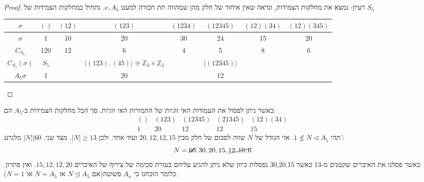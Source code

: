 \documentclass{tstextbook}
\begin{document}
\begin{proof}
רעיון: נמצא את מחלקות הצמידות, ונראה שאין איחוד של חלק מהן שמהווה תת חבורה למעט \(e,A_{5}\). נתחיל במחלקות הצמידות של \(S_{5}\)

  \begin{table}[htbp]
    \centering
    \begin{tabular}{|cccccccc|}
      \hline
      \(\sigma\) & \(()\) & \((12)\) & \((123)\) & \((1234)\) & \((12345)\) & \((12)(34)\) & \((12)(345)\) \\ \hline
      \(\sigma\) & 1 & 10 & 20 & 30 & 24 & 15 & 20 \\ \hline
      \(C_{S_5}\) & 120 & 12 & 6 & 4 & 5 & 8 & 6 \\ \hline
      \(C_{S_5}(\sigma)\) & \(S_5\) &  & \(\langle (123), (45) \rangle \cong \mathbb{Z}_3 \times \mathbb{Z}_2\) &  & \(\langle (12345) \rangle\) &  &  \\ \hline
      \(A_5\sigma\) & 1 &  & 20 &  & 12 &  &  \\ \hline
    \end{tabular}
  \end{table}
\end{proof}
כאשר ניתן לפסול את העמודות האי זוגיות של התמורות האי זוגיות. סך הכל
מחלקות הצמידות ב-\(A_{5}\) הם: $$\begin{matrix}()  & (123) & (12345) & (21345) & (12)(34) \\1 & 20 & 12 & 12 & 15
\end{matrix}$$ תהי \(1\nleq N \triangleleft A_{5}\). אזי הגודל של \(N\) שווה
לסכום של חלק מבין \(20,12,12,15\) ועוד אחד, ולכן \(|N|\geq 13\). מצד שני, \(|N|\big|60\) מלגרנג': $$N=\cancel{ 60 },30,20,15,\cancel{ 12,10,6 }$$
כאשר פסלנו את האיברים שקטנים מ-13 כאשר 30,20,15 נפסלות כיוון שלא ניתן להגיע עליהם בעזרת סכימה של צירוף של האיברים \(15,12,12,20\). ואין פתרון. כלומר הוכחנו כי \(A_{n}\) פשוטה(אם \(N\trianglelefteq A_{5}\) אז \(N=A_{5}\) או \(N=1\)).
\end{document}
